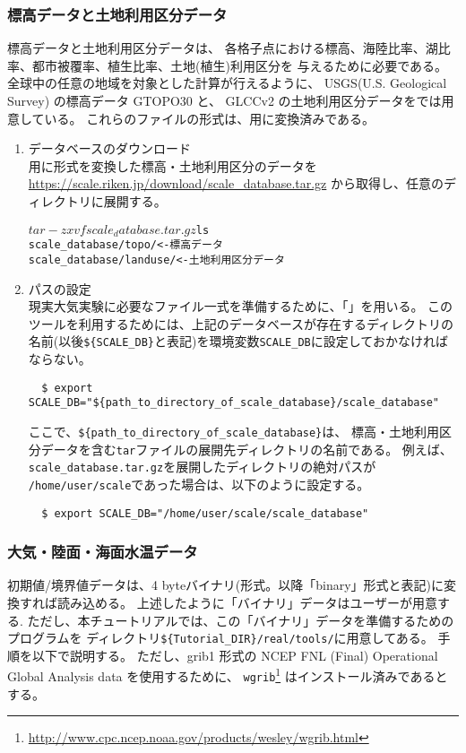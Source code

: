 \subsubsection{標高データと土地利用区分データ}
標高データと土地利用区分データは、
各格子点における標高、海陸比率、湖比率、都市被覆率、植生比率、土地(植生)利用区分を
与えるために必要である。
全球中の任意の地域を対象とした計算が行えるように、
USGS(U.S. Geological Survey) の標高データ GTOPO30 と、
GLCCv2 の土地利用区分データを{\scalerm}では用意している。
これらのファイルの形式は、{\scalerm}用に変換済みである。

\begin{enumerate}
\item データベースのダウンロード\\
\scalerm 用に形式を変換した標高・土地利用区分のデータを
 \url{https://scale.riken.jp/download/scale_database.tar.gz}
から取得し、任意のディレクトリに展開する。
\begin{alltt}
  $ tar -zxvf scale_database.tar.gz
  $ ls
    scale_database/topo/    <- 標高データ
    scale_database/landuse/ <- 土地利用区分データ
\end{alltt}

\item パスの設定\\
現実大気実験に必要なファイル一式を準備するために、「{\makeconftool}」を用いる。
このツールを利用するためには、上記のデータベースが存在するディレクトリの名前(以後\verb|${SCALE_DB}|と表記)を環境変数\verb|SCALE_DB|に設定しておかなければならない。
\begin{verbatim}
  $ export SCALE_DB="${path_to_directory_of_scale_database}/scale_database"
\end{verbatim}
ここで、\verb|${path_to_directory_of_scale_database}|は、
標高・土地利用区分データを含む\verb|tar|ファイルの展開先ディレクトリの名前である。
例えば、\verb|scale_database.tar.gz|を展開したディレクトリの絶対パスが
\verb|/home/user/scale|であった場合は、以下のように設定する。
\begin{verbatim}
  $ export SCALE_DB="/home/user/scale/scale_database"
\end{verbatim}
\end{enumerate}

\subsubsection{大気・陸面・海面水温データ}
初期値/境界値データは、4 byteバイナリ(\grads 形式。以降「binary」形式と表記)に変換すれば読み込める。
上述したように「バイナリ」データはユーザーが用意する.
ただし、本チュートリアルでは、この「バイナリ」データを準備するためのプログラムを
ディレクトリ\verb|${Tutorial_DIR}/real/tools/|に用意してある。
手順を以下で説明する。
ただし、grib1 形式の NCEP FNL (Final) Operational Global Analysis data を使用するために、
\verb|wgrib|\footnote{
\url{http://www.cpc.ncep.noaa.gov/products/wesley/wgrib.html}
}
はインストール済みであるとする。

